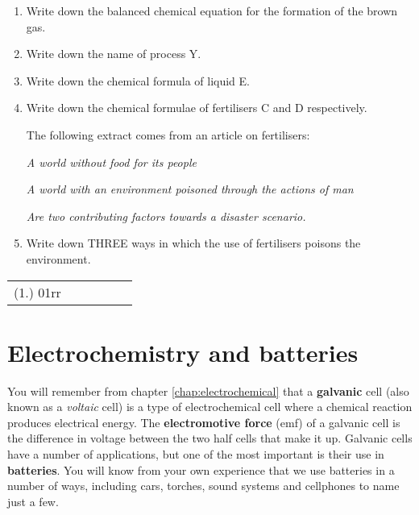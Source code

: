 {\begin{enumerate}
\item{Write down the balanced chemical equation for the formation of the brown gas.}
\item{Write down the name of process Y.}
\item{Write down the chemical formula of liquid E.}
\item{Write down the chemical formulae of fertilisers C and D respectively.}

The following extract comes from an article on fertilisers:
\begin{center}
\textit{A world without food for its people}

\textit{A world with an environment poisoned through the actions of man }

\textit{Are two contributing factors towards a disaster scenario.}

\end{center}

\item{Write down THREE ways in which the use of fertilisers poisons the environment.}
\end{enumerate}

\par \practiceinfo
\par \begin{tabular}[h]{cccccc}
(1.)	01rr	&
\end{tabular}

}

\section{Electrochemistry and batteries}
\label{sec:chemindustry:batteries}

You will remember from chapter \ref{chap:electrochemical} that a \textbf{galvanic} cell (also known as a \textit{voltaic} cell) is a type of electrochemical cell where a chemical reaction produces electrical energy. The \textbf{electromotive force} (emf) of a galvanic cell is the difference in voltage between the two half cells that make it up. Galvanic cells have a number of applications, but one of the most important is their use in \textbf{batteries}. You will know from your own experience that we use batteries in a number of ways, including cars, torches, sound systems and cellphones to name just a few.

